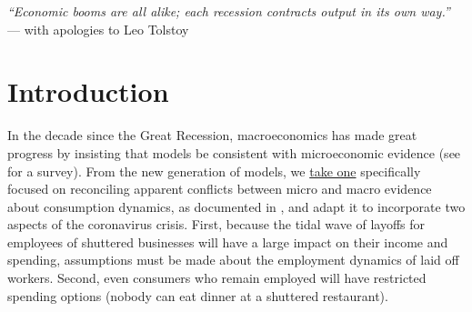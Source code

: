 \documentclass[titlepage,a4paper]{\econtex}
\begin{document}
\begin{authorsinfo}
\end{authorsinfo}


\setcounter{page}{1}

\titlepagefinish\newpage\pagestyle{empty}




\noindent \textit{\large ``Economic booms are all alike; each recession contracts output in its own way.''} \\ \indent --- with apologies to Leo Tolstoy

\section{Introduction}


In the decade since the Great Recession, macroeconomics has made great progress by insisting that models be consistent with microeconomic evidence (see \cite{kmpHandbook} for a survey).  From the new generation of models, we \href{https://econ.jhu.edu/people/ccarroll/papers/cAndCwithSTickyE}{take one} specifically focused on reconciling apparent conflicts between micro and macro evidence about consumption dynamics, as documented in \cite{hrsHabit}, and adapt it to incorporate two aspects of the coronavirus crisis. First, because the tidal wave of layoffs for employees of shuttered businesses will have a large impact on their income and spending, assumptions must be made about the employment dynamics of laid off workers.  Second, even consumers who remain employed will have restricted spending options (nobody can eat dinner at a shuttered restaurant).
\end{document}

